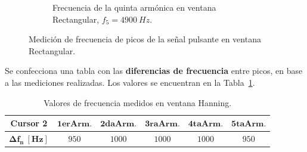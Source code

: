 \begin{figure}[H]
\begin{subfigure}[H]{0.48\textwidth}
          \caption{Frecuencia de la quinta armónica en ventana Rectangular, $f_{5}=4900~Hz$.}
        \end{subfigure}

        \caption{Medición de frecuencia de picos de la señal pulsante en ventana Rectangular.}
        \label{fig:Exp2SeñalPulsanteArmonicosEspectro}
      \end{figure}     

      Se confecciona una tabla con las \textbf{diferencias de frecuencia} entre picos, en 
      base a las mediciones realizadas. Los valores se encuentran en la 
      Tabla~\ref{tab:Exp2MedicionesHanning}.

      \begin{table}[H]
      \centering
        \begin{tabular}{cccccc} \hline \hline
          \textbf{Cursor 2}               &  $\mathbf{1erArm.}$       & $\mathbf{2daArm.}$        & $\mathbf{3raArm.}$  &   $\mathbf{4taArm.}$ &   $\mathbf{5taArm.}$ \\ \hline
          $\mathbf{\Delta f_{n}~[Hz]}$     &   $950$                   &    $1000$                  &   $1000$             & $1000$                & $950$                \\ \hline \hline
         \end{tabular}
          \caption{Valores de frecuencia medidos en ventana Hanning.}
          \label{tab:Exp2MedicionesHanning}
      \end{table}

